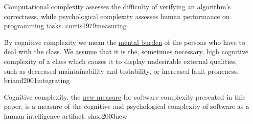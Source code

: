 \documentclass{article}
\begin{document}


  {Computational complexity assesses the difficulty of verifying an algorithm's correctness, while psychological complexity assesses human performance on programming tasks.}
  {curtis1979measuring}

  {By cognitive complexity we mean the \ul{mental burden} of the persons who have to deal with the class. We \ul{assume} that it is the, sometimes necessary, high cognitive complexity of a class which causes it to display undesirable external qualities, such as decreased maintainability and testability, or increased fault-proneness.}
  {briand2001integrating}

  {Cognitive complexity, the \ul{new measure} for software complexity presented in this paper, is a measure of the cognitive and psychological complexity of software as a human intelligence artifact.}
  {shao2003new}

\end{document}
